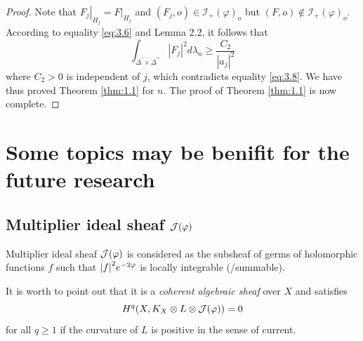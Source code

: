 \documentclass[lang=en,12pt,twoside]{textbook}
\begin{document}
\begin{proof}
Note that $\left.F_j\right|_{H_j}=\left.F\right|_{H_j}$ and $\left(F_j, o\right) \in \mathcal{I}_{+}(\varphi)_o$ but $(F, o) \notin \mathcal{I}_{+}(\varphi)_o$. According to equality \eqref{eq:3.6} and Lemma 2.2, it follows that
$$
\int_{\Delta^{\prime} \times \Delta^{\prime \prime}}\left|F_j\right|^2 d \lambda_n \geq \frac{C_2}{\left|a_j\right|^2}
$$
where $C_2>0$ is independent of $j$, which contradicts equality \eqref{eq:3.8}.
We have thus proved Theorem \ref{thm:1.1} for $n$. The proof of Theorem \ref{thm:1.1} is now complete.


\end{proof}



\section{Some topics may be benifit for the future research}
\subsection{Multiplier ideal sheaf \texorpdfstring{${\mathcal J}(\varphi)$}{}}
\begin{definition}\label{defi:MIF}
    Multiplier ideal sheaf ${\mathcal J}(\varphi)$ is considered as the subsheaf of germs of holomorphic functions $f$  such that $\abs{f}^2 e^{-2\varphi}$ is locally integrable (/summable).

    It is worth to point out that it is a \emph{coherent algebraic sheaf} over $X$ and satisfies
    \[H^q(X,K_X\otimes L\otimes {\mathcal J}(\varphi))=0\]
    for all $q\geq 1$ if the curvature of $L$ is positive in the sense of current.
\end{definition}
\end{document}
